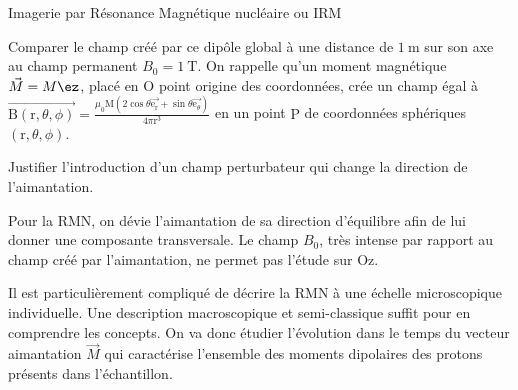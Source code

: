 \begin{exo}[PC][1][devoir]{Imagerie par Résonance Magnétique nucléaire ou IRM}
\begin{quest}
			\item Comparer le champ créé par ce dipôle global à une distance de $1 \mathrm{~m}$ sur son axe au champ permanent $B_0=1 \mathrm{~T}$. On rappelle qu'un moment magnétique $\Vec{M}=M \ez$, placé en $\mathrm{O}$ point origine des coordonnées, crée un champ égal à $\overrightarrow{\mathrm{B}(\mathrm{r}, \theta, \phi)}=\frac{\mu_{0} \mathrm{M}\left(2 \cos \theta \overrightarrow{\mathrm{e}_{\mathrm{r}}}+\sin \theta \overrightarrow{\mathrm{e}_{\theta}}\right)}{4 \pi \mathrm{r}^{3}}$ en un point $\mathrm{P}$ de coordonnées sphériques $(\mathrm{r}, \theta, \phi)$.

			\item Justifier l'introduction d'un champ perturbateur qui change la direction de l'aimantation.

		\end{quest}
			Pour la RMN, on dévie l'aimantation de sa direction d'équilibre afin de lui donner une composante transversale. Le champ $B_0$, très intense par rapport au champ créé par l'aimantation, ne permet pas l'étude sur $\mathrm{Oz}$.

			Il est particulièrement compliqué de décrire la RMN à une échelle microscopique individuelle. Une description macroscopique et semi-classique suffit pour en comprendre les concepts. On va donc étudier l'évolution dans le temps du vecteur aimantation $\vec{M}$ qui caractérise l'ensemble des moments dipolaires des protons présents dans l'échantillon.


\end{exo}
